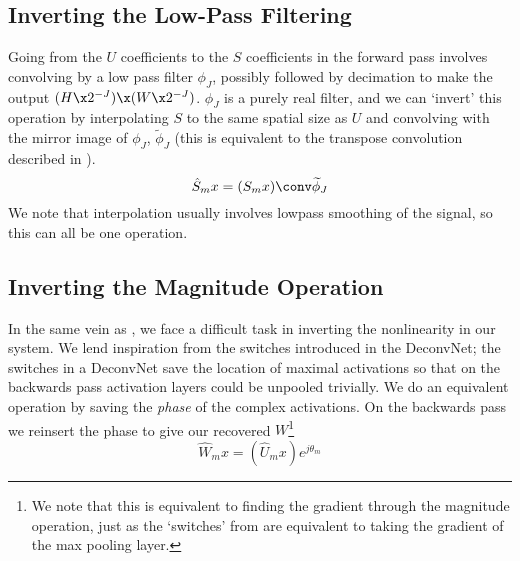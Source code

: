 \subsection{Inverting the Low-Pass Filtering}
Going from the $U$ coefficients to the $S$ coefficients in the forward pass involves convolving by
a low pass filter $\phi_J$, possibly followed by decimation to make the output $(H\x
2^{-J})\x (W\x2^{-J})$.  $\phi_J$ is a purely real filter, and we can `invert'
this operation by interpolating $S$ to the same spatial size as $U$ and convolving with
the mirror image of $\phi_J$, $\widetilde{\phi}_J$ (this is equivalent to the
transpose convolution described in \cite{zeiler_visualizing_2014}).
\begin{equation}
  \label{eq:ch4:s_hat}
  \hat{S}_{m}x = (S_{m}x) \conv \widetilde{\phi}_J
\end{equation}
We note that
interpolation usually involves lowpass smoothing of the signal, so this can all
be one operation.

\subsection{Inverting the Magnitude Operation}
In the same vein as \cite{zeiler_visualizing_2014}, we face a difficult
task in inverting the nonlinearity in our system.
We lend inspiration from the switches introduced in the DeconvNet; the
switches in a DeconvNet save the location of maximal activations so that
on the backwards pass activation layers could be unpooled trivially. We do an
equivalent operation by saving the \emph{phase} of the complex activations.
On the backwards pass we reinsert the phase to give our recovered
$W$\footnote{We note that this is equivalent to finding the gradient through the
magnitude operation, just as the `switches' from \cite{zeiler_visualizing_2014}
are equivalent to taking the gradient of the max pooling layer.}
\begin{equation}
  \label{eq:ch4:w_hat}
  \hat{W}_{m}x = \left(\hat{U}_{m} x\right) e^{j\theta_{m}}
\end{equation}

